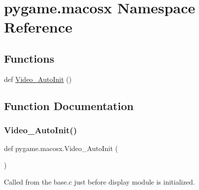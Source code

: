 \hypertarget{namespacepygame_1_1macosx}{}\section{pygame.\+macosx Namespace Reference}
\label{namespacepygame_1_1macosx}
\subsection*{Functions}
\begin{DoxyCompactItemize}
\item 
def \hyperlink{namespacepygame_1_1macosx_a193dd636315f5f33772ecf0bec3adc1d}{Video\+\_\+\+Auto\+Init} ()
\end{DoxyCompactItemize}


\subsection{Function Documentation}
\mbox{\label{namespacepygame_1_1macosx_a193dd636315f5f33772ecf0bec3adc1d}} 
\subsubsection{\texorpdfstring{Video\+\_\+\+Auto\+Init()}{Video\_AutoInit()}}
{\footnotesize\ttfamily def pygame.\+macosx.\+Video\+\_\+\+Auto\+Init (\begin{DoxyParamCaption}{ }\end{DoxyParamCaption})}

\begin{DoxyVerb}Called from the base.c just before display module is initialized.\end{DoxyVerb}
 